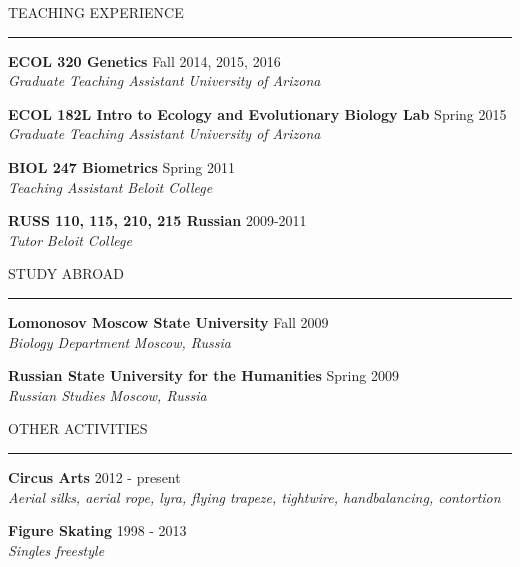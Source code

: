 \documentclass{resume} %
\renewenvironment{rSection}[1]{
\sectionskip
\textcolor{RoyalPurple}{\MakeUppercase{#1}}
\sectionlineskip
\hrule
\begin{list}{}{
\setlength{\leftmargin}{1.5em}
}
\item[]
}{
\end{list}
}
\begin{document}

\begin{rSection}{Teaching Experience}

{\bf ECOL 320 Genetics} \hfill Fall 2014, 2015, 2016 \\ 
{\em Graduate Teaching Assistant} \hfill {\em University of Arizona}

{\bf ECOL 182L Intro to Ecology and Evolutionary Biology Lab} \hfill Spring 2015 \\ 
{\em Graduate Teaching Assistant} \hfill {\em University of Arizona}

{\bf BIOL 247 Biometrics} \hfill Spring 2011 \\ 
{\em Teaching Assistant} \hfill {\em Beloit College}

{\bf RUSS 110, 115, 210, 215 Russian} \hfill 2009-2011 \\ 
{\em Tutor} \hfill {\em Beloit College}

\end{rSection}


\begin{rSection}{Study Abroad}

{\bf Lomonosov Moscow State University} \hfill Fall 2009 \\ 
{\em Biology Department} \hfill {\em Moscow, Russia}

{\bf Russian State University for the Humanities} \hfill Spring 2009 \\ 
{\em Russian Studies} \hfill {\em Moscow, Russia}

\end{rSection}


\begin{rSection}{Other Activities}

{\bf Circus Arts} \hfill 2012 - present \\ 
{\em Aerial silks, aerial rope, lyra, flying trapeze, tightwire, handbalancing, contortion} 

{\bf Figure Skating} \hfill 1998 - 2013 \\ 
{\em Singles freestyle} 

\end{rSection}
\end{document}
